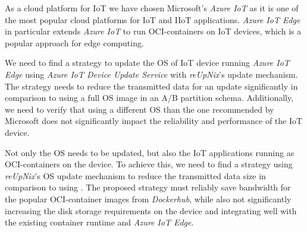 As a cloud platform for \ac{IoT} we have chosen Microsoft's \textit{Azure IoT}
as it is one of the most popular cloud platforms for \ac{IoT} and \ac{IIoT} applications.
\textit{Azure IoT Edge} in particular extends \textit{Azure IoT} to run
\ac{OCI}-containers on \ac{IoT} devices, which is a popular approach for edge
computing.

We need to find a strategy to update the \ac{OS} of \ac{IoT} device running
\textit{Azure IoT Edge} using \textit{Azure IoT Device Update Service} with
\textit{reUpNix}'s update mechanism. The strategy needs to reduce the transmitted data
for an update significantly in comparison to using a full \ac{OS} image in an
A/B partition schema. Additionally, we need to verify that using a different
\ac{OS} than the one recommended by Microsoft does not significantly impact
the reliability and performance of the \ac{IoT} device.


Not only the \ac{OS} needs to be updated, but also the \ac{IoT} applications
running as \ac{OCI}-containers on the device. To achieve this, we need to find a strategy
using \textit{reUpNix}'s \ac{OS} update mechanism to reduce the transmitted data
size in comparison to using . The proposed strategy must
reliably save bandwidth for the popular \ac{OCI}-container images from
\textit{Dockerhub}, while also not significantly increasing the disk storage
requirements on the device and integrating well with the existing container
runtime and \textit{Azure IoT Edge}.

